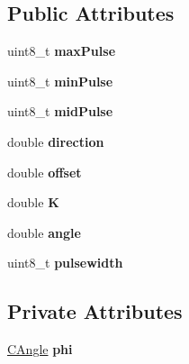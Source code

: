 \subsection*{Public Attributes}
\begin{DoxyCompactItemize}
\item 
\hypertarget{class_c_servo_a628ba3aef46603d316d77ff7b76fcc0d}{
uint8\_\-t {\bfseries maxPulse}}
\label{class_c_servo_a628ba3aef46603d316d77ff7b76fcc0d}

\item 
\hypertarget{class_c_servo_a1eb5c44af9d1d89eb2c92a02d40ae5ab}{
uint8\_\-t {\bfseries minPulse}}
\label{class_c_servo_a1eb5c44af9d1d89eb2c92a02d40ae5ab}

\item 
\hypertarget{class_c_servo_a2773fbbc7c689811b6f2e41fe8b9b66f}{
uint8\_\-t {\bfseries midPulse}}
\label{class_c_servo_a2773fbbc7c689811b6f2e41fe8b9b66f}

\item 
\hypertarget{class_c_servo_a3f3d7995f3aa08009bcc4e80722a3903}{
double {\bfseries direction}}
\label{class_c_servo_a3f3d7995f3aa08009bcc4e80722a3903}

\item 
\hypertarget{class_c_servo_a13db5ce69aa664f41cd2d3c24c4f9212}{
double {\bfseries offset}}
\label{class_c_servo_a13db5ce69aa664f41cd2d3c24c4f9212}

\item 
\hypertarget{class_c_servo_acff6d6ff970df4a96ed4d92c896be5d8}{
double {\bfseries K}}
\label{class_c_servo_acff6d6ff970df4a96ed4d92c896be5d8}

\item 
\hypertarget{class_c_servo_a20a671e02ab6416f56136eee32ce8f11}{
double {\bfseries angle}}
\label{class_c_servo_a20a671e02ab6416f56136eee32ce8f11}

\item 
\hypertarget{class_c_servo_a716d1348d87137fbcfdadcfc1a1ac6d0}{
uint8\_\-t {\bfseries pulsewidth}}
\label{class_c_servo_a716d1348d87137fbcfdadcfc1a1ac6d0}

\end{DoxyCompactItemize}
\subsection*{Private Attributes}
\begin{DoxyCompactItemize}
\item 
\hypertarget{class_c_servo_acadd986dcf23571b89686d836c70353d}{
\hyperlink{class_c_angle}{CAngle} {\bfseries phi}}
\label{class_c_servo_acadd986dcf23571b89686d836c70353d}

\end{DoxyCompactItemize}
